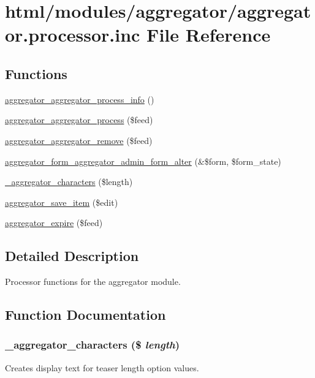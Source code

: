 \hypertarget{aggregator_8processor_8inc}{
\section{html/modules/aggregator/aggregator.processor.inc File Reference}
\label{aggregator_8processor_8inc}
}
\subsection*{Functions}
\begin{DoxyCompactItemize}
\item 
\hyperlink{aggregator_8processor_8inc_a7543703bc5549f0f99f5daa9d1671a49}{aggregator\_\-aggregator\_\-process\_\-info} ()
\item 
\hyperlink{aggregator_8processor_8inc_ac8c315c9888cf5cd17b1a119105b889b}{aggregator\_\-aggregator\_\-process} (\$feed)
\item 
\hyperlink{aggregator_8processor_8inc_a6e778e5eb28b433bc6f2cf8899984117}{aggregator\_\-aggregator\_\-remove} (\$feed)
\item 
\hyperlink{aggregator_8processor_8inc_afe5142db83732a99329131faa707c216}{aggregator\_\-form\_\-aggregator\_\-admin\_\-form\_\-alter} (\&\$form, \$form\_\-state)
\item 
\hyperlink{aggregator_8processor_8inc_a9775138f717325e52c92e42bbf9acc57}{\_\-aggregator\_\-characters} (\$length)
\item 
\hyperlink{aggregator_8processor_8inc_af2c2210d5c5da020679c2d78a161022d}{aggregator\_\-save\_\-item} (\$edit)
\item 
\hyperlink{aggregator_8processor_8inc_a09415d645937cbfa93210e3ead048c95}{aggregator\_\-expire} (\$feed)
\end{DoxyCompactItemize}


\subsection{Detailed Description}
Processor functions for the aggregator module. 

\subsection{Function Documentation}
\hypertarget{aggregator_8processor_8inc_a9775138f717325e52c92e42bbf9acc57}{
\subsubsection[{\_\-aggregator\_\-characters}]{\setlength{\rightskip}{0pt plus 5cm}\_\-aggregator\_\-characters (\$ {\em length})}}
\label{aggregator_8processor_8inc_a9775138f717325e52c92e42bbf9acc57}
Creates display text for teaser length option values.

